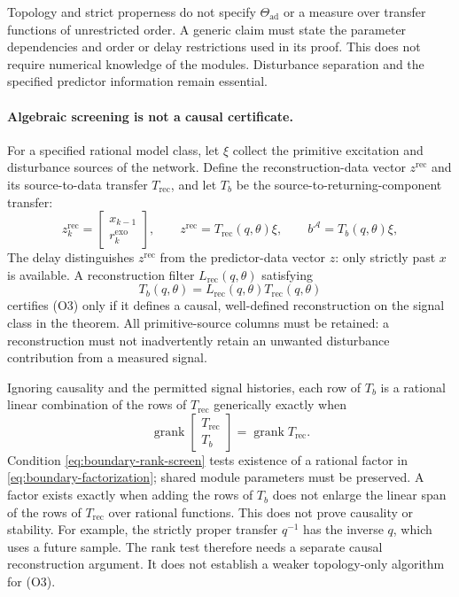 \documentclass[11pt,a4paper]{article}
\newcommand{\grank}{\operatorname{grank}}
\newcommand{\Aset}{\mathcal A}
\begin{document}
Topology and strict properness do not specify $\Theta_{\mathrm{ad}}$ or a measure over transfer functions of unrestricted order.  A generic claim must state the parameter dependencies and order or delay restrictions used in its proof.  This does not require numerical knowledge of the modules.  Disturbance separation and the specified predictor information remain essential.

\paragraph{Algebraic screening is not a causal certificate.}
For a specified rational model class, let $\xi$ collect the primitive excitation and disturbance sources of the network.  Define the reconstruction-data vector $z^{\mathrm{rec}}$ and its source-to-data transfer $T_{\mathrm{rec}}$, and let $T_b$ be the source-to-returning-component transfer:
\[
  z^{\mathrm{rec}}_k=\begin{bmatrix}x_{k-1}\\r^{\mathrm{exo}}_k\end{bmatrix},
  \qquad
  z^{\mathrm{rec}}=T_{\mathrm{rec}}(q,\theta)\xi,
  \qquad
  b^{\Aset}=T_b(q,\theta)\xi,
\]
The delay distinguishes $z^{\mathrm{rec}}$ from the predictor-data vector $z$: only strictly past $x$ is available.  A reconstruction filter $L_{\mathrm{rec}}(q,\theta)$ satisfying
\begin{equation}
  T_b(q,\theta)=L_{\mathrm{rec}}(q,\theta)T_{\mathrm{rec}}(q,\theta)
  \label{eq:boundary-factorization}
\end{equation}
certifies (O3) only if it defines a causal, well-defined reconstruction on the signal class in the theorem.  All primitive-source columns must be retained: a reconstruction must not inadvertently retain an unwanted disturbance contribution from a measured signal.

Ignoring causality and the permitted signal histories, each row of $T_b$ is a rational linear combination of the rows of $T_{\mathrm{rec}}$ generically exactly when
\begin{equation}
  \grank\!\begin{bmatrix}T_{\mathrm{rec}}\\T_b\end{bmatrix}
  =\grank T_{\mathrm{rec}}.
  \label{eq:boundary-rank-screen}
\end{equation}
Condition \eqref{eq:boundary-rank-screen} tests existence of a rational factor in \eqref{eq:boundary-factorization}; shared module parameters must be preserved.  A factor exists exactly when adding the rows of $T_b$ does not enlarge the linear span of the rows of $T_{\mathrm{rec}}$ over rational functions.  This does not prove causality or stability.  For example, the strictly proper transfer $q^{-1}$ has the inverse $q$, which uses a future sample.  The rank test therefore needs a separate causal reconstruction argument.  It does not establish a weaker topology-only algorithm for (O3).
\end{document}
